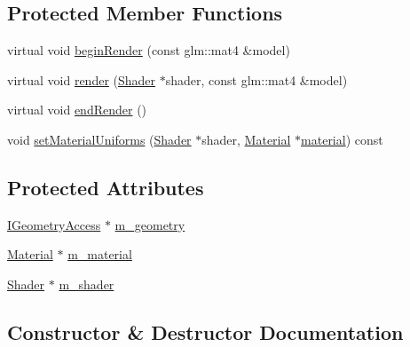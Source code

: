 \subsection*{Protected Member Functions}
\begin{DoxyCompactItemize}
\item 
virtual void \mbox{\hyperlink{classec_1_1_drawable_a9cb72c1eda19a82c849a291e7d45f2b8}{begin\+Render}} (const glm\+::mat4 \&model)
\item 
virtual void \mbox{\hyperlink{classec_1_1_drawable_a328de693753d863f567e64f1ff6acfd4}{render}} (\mbox{\hyperlink{classec_1_1_shader}{Shader}} $\ast$shader, const glm\+::mat4 \&model)
\item 
virtual void \mbox{\hyperlink{classec_1_1_drawable_abf99119cd72054a55d91a7605aa62e32}{end\+Render}} ()
\item 
void \mbox{\hyperlink{classec_1_1_drawable_a94739c3f22a3f52edb0a7213d4b16907}{set\+Material\+Uniforms}} (\mbox{\hyperlink{classec_1_1_shader}{Shader}} $\ast$shader, \mbox{\hyperlink{classec_1_1_material}{Material}} $\ast$\mbox{\hyperlink{namespaceec_ae4420ccd0f79418a5ce075e43909289faeec34d804c9ce6c89cff596be555e6a4}{material}}) const
\end{DoxyCompactItemize}
\subsection*{Protected Attributes}
\begin{DoxyCompactItemize}
\item 
\mbox{\hyperlink{classec_1_1_i_geometry_access}{I\+Geometry\+Access}} $\ast$ \mbox{\hyperlink{classec_1_1_drawable_a12fc649448250ab8a16e862495d22752}{m\+\_\+geometry}}
\item 
\mbox{\hyperlink{classec_1_1_material}{Material}} $\ast$ \mbox{\hyperlink{classec_1_1_drawable_ae95da71e937a2008a84300b8d29ac052}{m\+\_\+material}}
\item 
\mbox{\hyperlink{classec_1_1_shader}{Shader}} $\ast$ \mbox{\hyperlink{classec_1_1_drawable_aee71f07b65189391a7a465d880d744e3}{m\+\_\+shader}}
\end{DoxyCompactItemize}


\subsection{Constructor \& Destructor Documentation}
\mbox{\label{classec_1_1_drawable_adb3c4e7b4d3d510489a26b3d1a8094a2}} 
